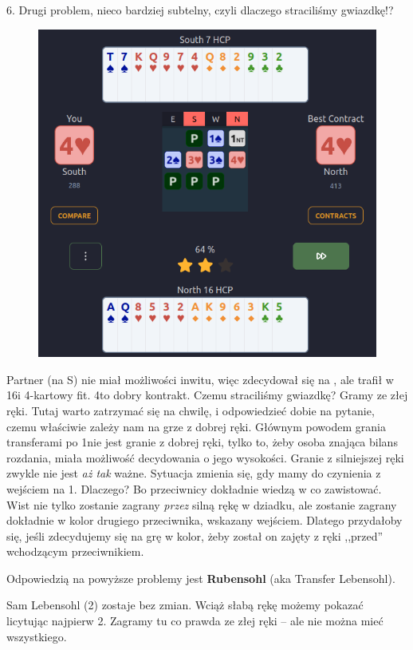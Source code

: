 \documentclass[12pt, a4paper]{article}
\begin{document}
6. Drugi problem, nieco bardziej subtelny, czyli dlaczego straciliśmy gwiazdkę!?

\begin{figure}[H]
    \centering
    \includegraphics[width=0.7\linewidth]{cuebids.png}
\end{figure}

Partner (na S) nie miał możliwości inwitu, więc zdecydował się na \gf, ale trafił w
16\hcp i 4-kartowy fit. 4\hearts to dobry kontrakt. Czemu straciliśmy gwiazdkę? Gramy ze złej ręki.
Tutaj warto zatrzymać się na chwilę, i odpowiedzieć dobie na pytanie, czemu właściwie
zależy nam na grze z dobrej ręki. Głównym powodem grania transferami po 1\nt nie jest granie z dobrej ręki,
tylko to, żeby osoba znająca bilans rozdania, miała możliwość decydowania o jego wysokości.
Granie z silniejszej ręki zwykle nie jest \textit{aż tak} ważne. Sytuacja zmienia się, gdy mamy do czynienia
z wejściem na 1\nt. Dlaczego? Bo przeciwnicy dokładnie wiedzą w co zawistować. Wist nie tylko
zostanie zagrany \textit{przez} silną rękę w dziadku, ale zostanie zagrany dokładnie w kolor drugiego
przeciwnika, wskazany wejściem. Dlatego przydałoby się, jeśli zdecydujemy się na grę w kolor, 
żeby został on zajęty z ręki ,,przed'' wchodzącym przeciwnikiem.

Odpowiedzią na powyższe problemy jest 
\textbf{{\color{red}R}{\color{orange}u}{\color{LimeGreen}b}{\color{cyan}e}{\color{blue}n}{\color{purple}s}{\color{red}o}{\color{orange}h}{\color{LimeGreen}l}} (aka Transfer Lebensohl).

Sam Lebensohl (2\nt) zostaje bez zmian. Wciąż słabą rękę możemy pokazać licytując najpierw 2\nt.
Zagramy tu co prawda ze złej ręki -- ale nie można mieć wszystkiego.
\end{document}
